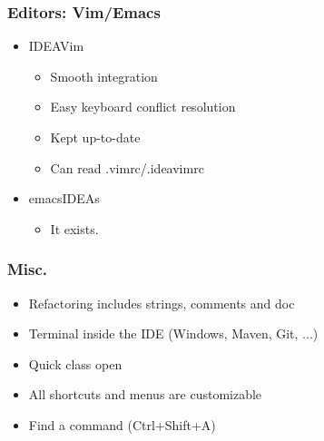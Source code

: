 \begin{frame}
  \frametitle{Editors: Vim/Emacs}
  \begin{itemize}
    \item IDEAVim
      \begin{itemize}
        \item Smooth integration
        \item Easy keyboard conflict resolution
        \item Kept up-to-date
        \item Can read .vimrc/.ideavimrc
      \end{itemize}
    \item emacsIDEAs
      \begin{itemize}
        \item It exists.
      \end{itemize}
  \end{itemize}
\end{frame}

\begin{frame}
  \frametitle{Misc.}
  \begin{itemize}
    \item Refactoring includes strings, comments and doc
    \item Terminal inside the IDE (Windows, Maven, Git, ...)
    \item Quick class open
    \item All shortcuts and menus are customizable
    \item Find a command (Ctrl+Shift+A)
  \end{itemize}
\end{frame}

